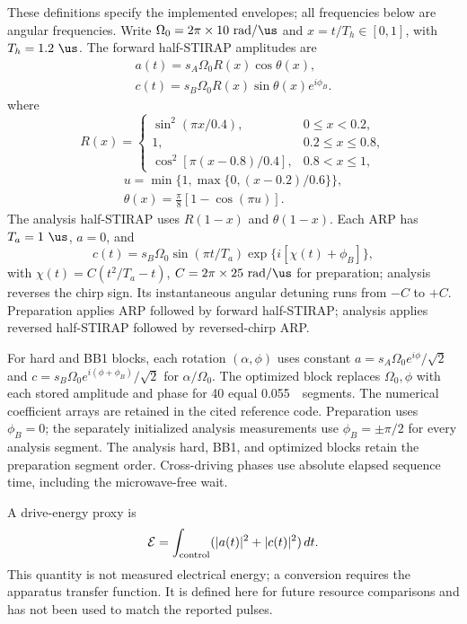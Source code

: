
These definitions specify the implemented envelopes; all frequencies below are angular frequencies. Write $\Omega_0=2\pi\times10~\mathrm{rad}/\us$ and $x=t/T_h\in[0,1]$, with $T_h=1.2~\us$. The forward half-STIRAP amplitudes are
\begin{align}
 a(t)=s_A\Omega_0 R(x)\cos\theta(x),\\
 c(t)=s_B\Omega_0 R(x)\sin\theta(x)e^{i\phi_B}.
\end{align}
where
\begin{equation}
R(x)=\begin{cases}
\sin^2(\pi x/0.4),&0\le x<0.2,\\
1,&0.2\le x\le0.8,\\
\cos^2[\pi(x-0.8)/0.4],&0.8<x\le1,
\end{cases}
\end{equation}
\begin{align}
 u=\min\{1,\max\{0,(x-0.2)/0.6\}\},\\
 \theta(x)=\frac{\pi}{8}[1-\cos(\pi u)].
\end{align}
The analysis half-STIRAP uses $R(1-x)$ and $\theta(1-x)$. Each ARP has $T_a=1~\us$, $a=0$, and
\begin{equation}
 c(t)=s_B\Omega_0\sin(\pi t/T_a)
 \exp\{i[\chi(t)+\phi_B]\},
\end{equation}
with $\chi(t)=C(t^2/T_a-t)$, $C=2\pi\times25~\mathrm{rad}/\us$ for preparation; analysis reverses the chirp sign. Its instantaneous angular detuning runs from $-C$ to $+C$. Preparation applies ARP followed by forward half-STIRAP; analysis applies reversed half-STIRAP followed by reversed-chirp ARP.

For hard and BB1 blocks, each rotation $(\alpha,\phi)$ uses constant $a=s_A\Omega_0e^{i\phi}/\sqrt2$ and $c=s_B\Omega_0e^{i(\phi+\phi_B)}/\sqrt2$ for $\alpha/\Omega_0$. The optimized block replaces $\Omega_0,\phi$ with each stored amplitude and phase for 40 equal 0.055~\us\ segments. The numerical coefficient arrays are retained in the cited reference code. Preparation uses $\phi_B=0$; the separately initialized analysis measurements use $\phi_B=\pm\pi/2$ for every analysis segment. The analysis hard, BB1, and optimized blocks retain the preparation segment order. Cross-driving phases use absolute elapsed sequence time, including the microwave-free wait.

A drive-energy proxy is
\begin{equation}
\mathcal E=\int_{\rm control}(|a(t)|^2+|c(t)|^2)\,dt.
\end{equation}
This quantity is not measured electrical energy; a conversion requires the apparatus transfer function. It is defined here for future resource comparisons and has not been used to match the reported pulses.
